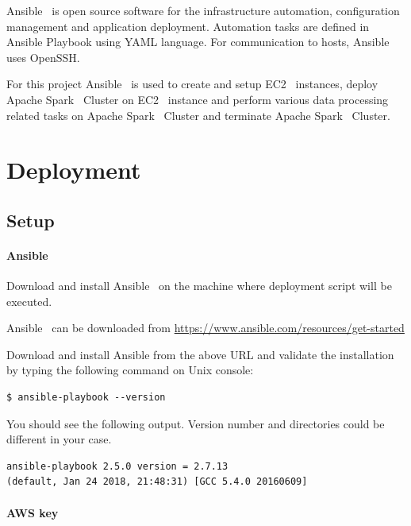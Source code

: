 Ansible~\cite{hid-sp18-511-www-ansible} is open source software for
the infrastructure automation, configuration management and
application deployment. Automation tasks are defined in Ansible
Playbook using YAML language. For communication to hosts,
Ansible~\cite{hid-sp18-511-www-ansible} uses OpenSSH\@.

For this project Ansible~\cite{hid-sp18-511-www-ansible} is used to
create and setup EC2~\cite{hid-sp18-511-www-ec2} instances, deploy
Apache Spark~\cite{hid-sp18-511-www-spark} Cluster on
EC2~\cite{hid-sp18-511-www-ec2} instance and perform various data
processing related tasks on Apache Spark~\cite{hid-sp18-511-www-spark}
Cluster and terminate Apache Spark~\cite{hid-sp18-511-www-spark}
Cluster.

\section{Deployment}


\subsection{Setup}



\paragraph{Ansible}
Download and install Ansible~\cite{hid-sp18-511-www-ansible} on the
machine where deployment script will be executed.

Ansible~\cite{hid-sp18-511-www-ansible} can be downloaded from
\url{https://www.ansible.com/resources/get-started}

Download and install Ansible from the above URL and validate the
installation by typing the following command on Unix console:

\begin{verbatim}
$ ansible-playbook --version
\end{verbatim}

You should see the following output. Version number and directories
could be different in your case.

\begin{verbatim}
ansible-playbook 2.5.0 version = 2.7.13
(default, Jan 24 2018, 21:48:31) [GCC 5.4.0 20160609]
\end{verbatim}

\paragraph{AWS key}

